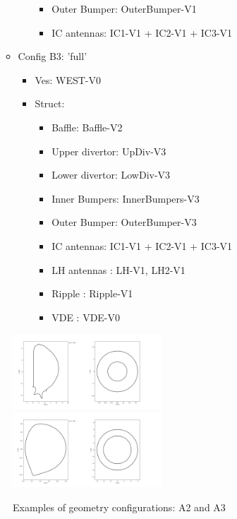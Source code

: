 \documentclass[11pt]{amsart}
\begin{document}
\begin{itemize}
\begin{itemize}
\begin{itemize}
\begin{itemize}
				\item      Outer Bumper: OuterBumper-V1
				\item      IC antennas: IC1-V1 + IC2-V1
                                  + IC3-V1
			\end{itemize}
		\end{itemize}
	      \item  Config B3: 'full'
                \begin{itemize}
			\item  Ves: WEST-V0
			\item  Struct:
			\begin{itemize}
			        \item      Baffle: Baffle-V2
			        \item      Upper divertor: UpDiv-V3
			        \item      Lower divertor: LowDiv-V3
			        \item      Inner Bumpers: InnerBumpers-V3
				\item      Outer Bumper: OuterBumper-V3
				\item      IC antennas: IC1-V1 + IC2-V1
                                  + IC3-V1
				\item      LH antennas : LH-V1, LH2-V1
				\item      Ripple : Ripple-V1
				\item      VDE : VDE-V0
			\end{itemize}
	\end{itemize}
\end{itemize}
\end{itemize}

\begin{figure}[h]
  \caption{Examples of geometry configurations: A2 and A3}
  \centering
  \includegraphics[width=0.5\textwidth]{./figures/figure.png}
  \includegraphics[width=0.5\textwidth]{./figures/figure2.png}
\end{figure}
\end{document}
